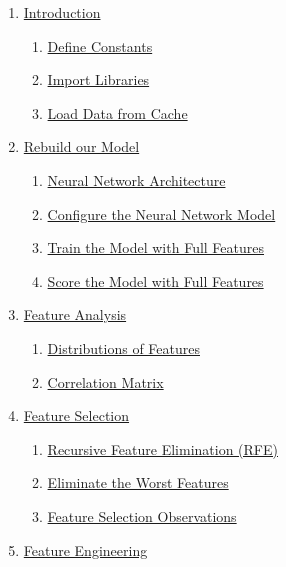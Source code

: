\documentclass[11pt]{article}
\providecommand{\tightlist}{%
      \setlength{\itemsep}{0pt}\setlength{\parskip}{0pt}}
\begin{document}
\begin{enumerate}
\def\labelenumi{\arabic{enumi}.}
\tightlist
\item
  \hyperref[introduction]{Introduction}

  \begin{enumerate}
  \def\labelenumii{\arabic{enumii}.}
  \tightlist
  \item
    \hyperref[define-constants]{Define Constants}
  \item
    \hyperref[import-libraries]{Import Libraries}
  \item
    \hyperref[load-data-from-cache]{Load Data from Cache}
  \end{enumerate}
\item
  \hyperref[rebuild-our-model]{Rebuild our Model}

  \begin{enumerate}
  \def\labelenumii{\arabic{enumii}.}
  \tightlist
  \item
    \hyperref[neural-network-architecture]{Neural Network Architecture}
  \item
    \hyperref[configure-the-neural-network-model]{Configure the Neural Network Model}
  \item
    \hyperref[train-the-model-with-full-features]{Train the Model with Full Features}
  \item
    \hyperref[score-the-model-with-full-features]{Score the Model with Full Features}
  \end{enumerate}
\item
  \hyperref[feature-analysis]{Feature Analysis}

  \begin{enumerate}
  \def\labelenumii{\arabic{enumii}.}
  \tightlist
  \item
    \hyperref[distributions-of-features]{Distributions of Features}
  \item
    \hyperref[correlation-matrix]{Correlation Matrix}
  \end{enumerate}
\item
  \hyperref[feature-selection]{Feature Selection}

  \begin{enumerate}
  \def\labelenumii{\arabic{enumii}.}
  \tightlist
  \item
    \hyperref[recursive-feature-elimination-rfe]{Recursive Feature Elimination (RFE)}
  \item
    \hyperref[eliminate-the-worst-features]{Eliminate the Worst Features}
  \item
    \hyperref[feature-selection-observations]{Feature Selection Observations}
  \end{enumerate}
\item
  \hyperref[feature-engineering]{Feature Engineering}


\end{enumerate}
\end{document}
